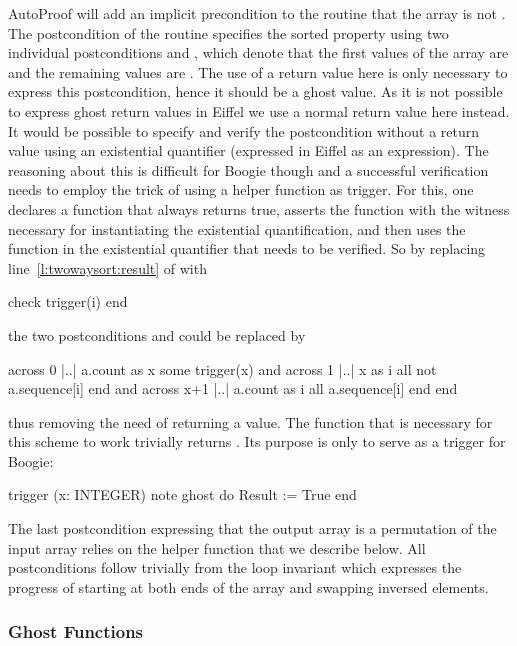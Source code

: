 AutoProof will add an implicit precondition to the  routine that the array  is not . The postcondition of the routine specifies the sorted property using two individual postconditions  and , which denote that the first  values of the array are  and the remaining values are . The use of a return value here is only necessary to express this postcondition, hence it should be a ghost value. As it is not possible to express ghost return values in Eiffel we use a normal return value here instead. It would be possible to specify and verify the postcondition without a return value using an existential quantifier (expressed in Eiffel as an  expression). The reasoning about this is difficult for Boogie though and a successful verification needs to employ the trick of using a helper function as trigger. For this, one declares a function that always returns true, asserts the function with the witness necessary for instantiating the existential quantification, and then uses the function in the existential quantifier that needs to be verified. So by replacing line~\ref{l:twowaysort:result} of  with
\begin{erunning}
check trigger(i) end
\end{erunning}
the two postconditions  and  could be replaced by
\begin{erunning}
across 0 |..| a.count as x some
	trigger(x) and
	across 1 |..| x as i all not a.sequence[i] end and
	across x+1 |..| a.count as i all a.sequence[i] end
end
\end{erunning}
thus removing the need of returning a value.
The function  that is necessary for this scheme to work trivially returns . Its purpose is only to serve as a trigger for Boogie:
\begin{erunning}
trigger (x: INTEGER) note ghost do Result := True end
\end{erunning}

The last postcondition expressing that the output array is a permutation of the input array relies on the helper function  that we describe below. All postconditions follow trivially from the loop invariant which expresses the progress of starting at both ends of the array and swapping inversed elements.

\subsubsection{Ghost Functions}

